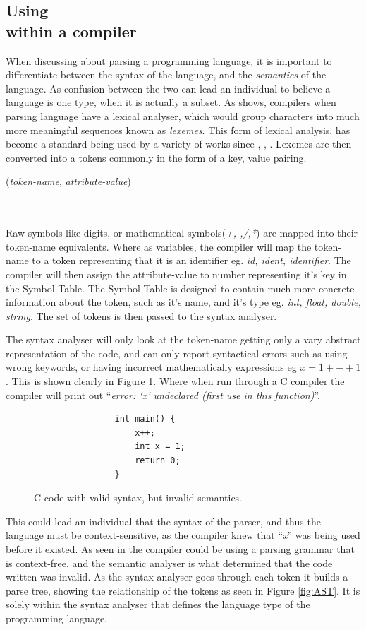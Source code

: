\subsection{Using \hierarchy{} \\within a compiler}
When discussing about parsing a programming language, it is important to differentiate between the syntax of the language, and the \emph{semantics} of the language. As confusion between the two can lead an individual to believe a language is one type, when it is actually a subset. As \citep{DragonBook} shows, compilers when parsing language have a lexical analyser, which would group characters into much more meaningful sequences known as \emph{lexemes}. This form of lexical analysis, has become a standard being used by a variety of works since \citep{CompilerTutorial}, \citep{CompilerBasics}, \citep{CompilerConstruction}. Lexemes are then converted into a tokens commonly in the form of a key, value pairing. \\ \centerline{(\emph{token-name}, \emph{attribute-value})} \\\\
Raw symbols like digits, or mathematical symbols(\emph{+,-,/,*}) are mapped into their token-name equivalents. Where as variables, the compiler will map the token-name to a token representing that it is an identifier eg. \emph{id, ident, identifier}. The compiler will then assign the attribute-value to number representing it's key in the Symbol-Table. The Symbol-Table is designed to contain much more concrete information about the token, such as it's name, and it's type eg. \emph{int, float, double, string}. The set of tokens is then passed to the syntax analyser.

\newpage
The syntax analyser will only look at the token-name getting only a vary abstract representation of the code, and can only report syntactical errors such as using wrong keywords, or having incorrect mathematically expressions eg $x = 1 + - + 1$. This is shown clearly in Figure \ref{fig:InvalidC}. Where when run through a C compiler the compiler will print out ``\emph{error: \lq{}x\rq{} undeclared (first use in this function)}''. 
\begin{figure}[ht!]
    \centering
    \small
    \begin{verbatim}
                int main() {
                    x++;
                    int x = 1;
                    return 0;
                }
    \end{verbatim}
    \caption{C code with valid syntax, but invalid semantics.}
    \label{fig:InvalidC}
\end{figure}
This could lead an individual that the syntax of the parser, and thus the language must be context-sensitive, as the compiler knew that ``\emph{x}'' was being used before it existed. As seen in \citep{DragonBook} the compiler could be using a parsing grammar that is context-free, and the semantic analyser is what determined that the code written was invalid. As the syntax analyser goes through each token it builds a parse tree, showing the relationship of the tokens as seen in Figure \ref{fig:AST}. It is solely within the syntax analyser that defines the language type of the programming language.

